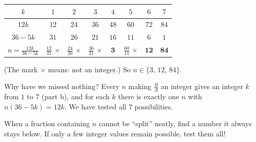 {
\begin{center}
\begin{tabular}{|c|c|c|c|c|c|c|c|}
\hline
\rowcolor{tmBlue!10}$k$ & $1$ & $2$ & $3$ & $4$ & $5$ & $6$ & $7$\\ \hline
$12k$ & $12$ & $24$ & $36$ & $48$ & $60$ & $72$ & $84$\\ \hline
$36-5k$ & $31$ & $26$ & $21$ & $16$ & $11$ & $6$ & $1$\\ \hline
$n=\frac{12k}{36-5k}$ & $\frac{12}{31}$ $\times$ & $\frac{24}{26}$ $\times$ & $\frac{36}{21}$ $\times$ & $\mathbf{3}$ & $\frac{60}{11}$ $\times$ & $\mathbf{12}$ & $\mathbf{84}$\\ \hline
\end{tabular}
\end{center}
(The mark $\times$ means: not an integer.)
So $n\in\{3,\,12,\,84\}$.
\begin{proofbox}Why have we missed nothing? Every $n$ making $\frac{B}{A}$ an integer gives an integer $k$ from $1$ to $7$ (part b), and for each $k$ there is exactly one $n$ with $n(36-5k)=12k$. We have tested all $7$ possibilities.\end{proofbox}
\begin{tipbox}When a fraction containing $n$ cannot be ``split'' neatly, find a number it always stays below. If only a few integer values remain possible, test them all!\end{tipbox}
}

